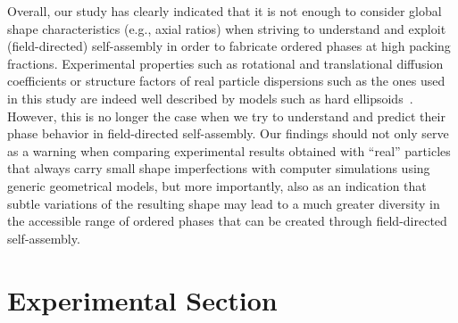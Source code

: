 \documentclass[aps,prl,preprint,superscriptaddress,showkeys]{revtex4-2} %
\begin{document}
Overall, our study has clearly indicated that it is not enough to consider global shape characteristics (e.g., axial ratios) when striving to understand and exploit (field-directed) self-assembly in order to fabricate ordered phases at high packing fractions. Experimental properties such as rotational and translational diffusion coefficients or structure factors of real particle dispersions such as the ones used in this study are indeed well described by models such as hard ellipsoids~\cite{martchenko2011,martchenko2016anisotropic,reufer2010morphology, reufer2012differential}. However, this is no longer the case when we try to understand and predict their phase behavior in field-directed self-assembly. Our findings should not only serve as a warning when comparing experimental results obtained with ``real'' particles that always carry small shape imperfections with computer simulations using generic geometrical models, but more importantly, also as an indication that subtle variations of the resulting shape may lead to a much greater diversity in the accessible range of ordered phases that can be created through field-directed self-assembly.\par
\section{Experimental Section}
\end{document}
